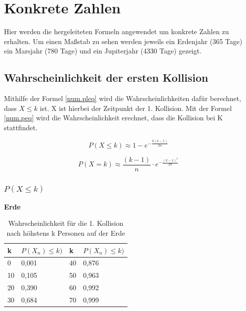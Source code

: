 \documentclass[../main.tex]{subfiles}
\begin{document}
\section{Konkrete Zahlen}
Hier werden die hergeleiteten Formeln angewendet um konkrete Zahlen zu erhalten. Um einen Maßstab zu sehen werden jeweils ein Erdenjahr (365 Tage) ein Marsjahr (780 Tage) und ein Jupiterjahr (4330 Tage) gezeigt.
\subsection{Wahrscheinlichkeit der ersten Kollision}

Mithilfe der Formel \ref{num.pleq} wird die Wahrscheinlichkeiten dafür berechnet, dass $X \leq k$ ist. X ist hierbei der Zeitpunkt der 1. Kollision. Mit der Formel \ref{num.peq} wird die Wahrscheinlichkeit erechnet, dass die Kollision bei K stattfindet.

\begin{equation}
 P(X \leq k) \approx 1 - e^{- \frac{k(k-1)}{2n}}
 \label{num.pleq}
\end{equation}

\begin{equation}
 P(X = k) \approx \frac{(k-1)}{n} \cdot e^{- \frac{(k-1)^2}{2n}}
 \label{num.peq}
\end{equation}

\subsubsection{$P(X \leq k)$}

\textbf{Erde}

\begin{table}[h]
\centering
\begin{tabular}{|l|l|l|l|}
\hline
k  & $P(X_{n}) \leq k)$ & k  & $P(X_{n}) \leq k)$ \\ \hline
0  & 0,001            & 40 & 0,876            \\
10 & 0,105            & 50 & 0,963            \\
20 & 0,390            & 60 & 0,992            \\
30 & 0,684            & 70 & 0,999            \\ \hline
\end{tabular}
\caption{\label{num.tpe} Wahrscheinlichkeit für die 1. Kollision nach höhstens k Personen auf der Erde}
\end{table}
\end{document}
